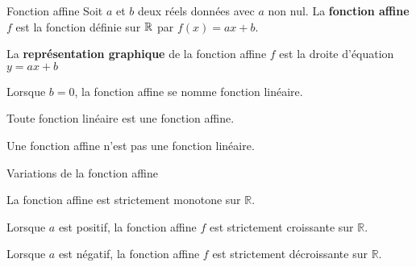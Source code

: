 \begin{pageCours}
\begin{minipage}{0.48\linewidth}

\begin{DefT}{Fonction affine}
Soit $a$ et $b$ deux réels données avec $a$ non nul.
La \textbf{fonction affine} $f$ est la fonction définie sur $\mathbb R$ par $f(x)=ax+b$.
 
La \textbf{représentation graphique} de la fonction affine $f$ est la droite d'équation $y=ax+b$ 
\end{DefT}

\begin{Rq}
Lorsque $b=0$, la fonction affine se nomme fonction linéaire.
\end{Rq}

\begin{Log}
Toute fonction linéaire est une fonction affine. 

Une fonction affine n'est pas une fonction linéaire.
\end{Log}

\end{minipage}
\hfill
\begin{minipage}{0.48\linewidth}
 


\begin{ThT}{Variations de la fonction affine}

La fonction affine est strictement monotone sur $\mathbb R$.

Lorsque $a$ est positif, la fonction affine $f$ est strictement croissante sur $\mathbb R$.

Lorsque $a$ est négatif, la fonction affine $f$ est strictement décroissante sur $\mathbb R$. 
\end{ThT}

\begin{Ill}
\end{Ill}




\end{minipage}
 


\end{pageCours} 
